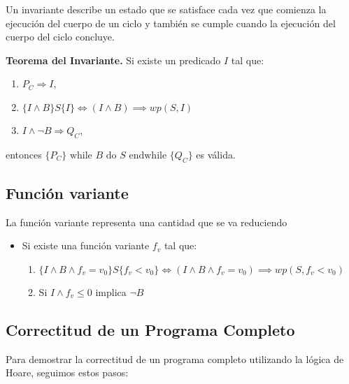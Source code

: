 \documentclass[9pt]{extarticle}  %
\newcommand{\smalltable}{\fontsize{8pt}{10pt}\selectfont}
\begin{document}
Un invariante describe un estado que se satisface cada vez que comienza la ejecución del cuerpo de un ciclo y también se cumple cuando la ejecución del cuerpo del ciclo concluye.

\textbf{Teorema del Invariante.} Si existe un predicado \( I \) tal que:
\begin{enumerate}
    \item \( P_C \Rightarrow I \),
    \item $ \{ I \wedge B \} S \{ I \} \iff (I \wedge B) \implies wp(S, I) $
    \item \(I \land \neg B \Rightarrow Q_C\),
\end{enumerate}
entonces \( \{P_C\} \text{ while } B \text{ do } S \text{ endwhile } \{Q_C\} \) es válida.
\subsection*{\tiny{Función variante}}
\noindent\smalltable
La función variante representa una cantidad que se va
reduciendo
\begin{itemize}
    \item {Si existe una función variante \(f_v\) tal que:
\begin{enumerate}\item $ \{ I \wedge B \wedge f_v = v_0 \} S \{ f_v < v_0 \} \iff (I \wedge B \wedge f_v = v_0) \implies wp(S, f_v < v_0) $

    \item Si \(I \land f_v \leq 0\) implica \(\neg B\)
\end{enumerate}}
\end{itemize}
\subsection*{\tiny{Correctitud de un Programa Completo}}
\noindent\smalltable
Para demostrar la correctitud de un programa completo utilizando la lógica de Hoare, seguimos estos pasos:
\end{document}
